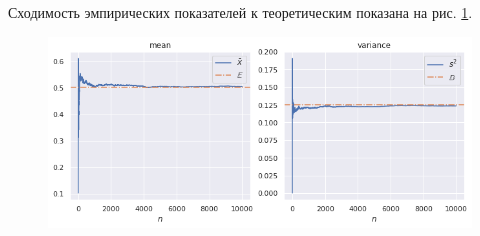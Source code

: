         Сходимость эмпирических показателей к теоретическим показана на рис. 
        \ref{task2_meanvar}.

        \begin{figure}[tbp]
            \centering
            \includegraphics[width=1.0\textwidth]{resources/task2_meanvar.png}
            \caption{}
            \label{task2_meanvar}
        \end{figure}